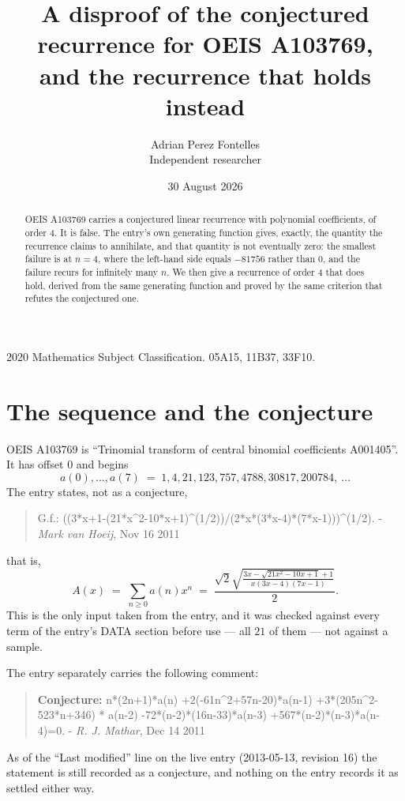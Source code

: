 \documentclass[11pt,a4paper]{article}
\title{A disproof of the conjectured recurrence for OEIS A103769,\\ and the recurrence
that holds instead}
\author{Adrian Perez Fontelles\\ \small Independent researcher}
\date{30 August 2026}
\theoremstyle{plain}
\theoremstyle{definition}
\begin{document}
\maketitle

\begin{abstract}
OEIS A103769 carries a conjectured linear recurrence with polynomial coefficients, of
order 4. It is false. The entry's own generating function gives, exactly, the
quantity the recurrence claims to annihilate, and that quantity is not eventually zero:
the smallest failure is at $n=4$, where the left-hand side equals $-81756$
rather than $0$, and the failure recurs for infinitely many $n$. We then give a recurrence
of order 4 that does hold, derived from the same generating function and proved by
the same criterion that refutes the conjectured one.
\end{abstract}

\noindent\small 2020 Mathematics Subject Classification. 05A15, 11B37, 33F10.\normalsize

\section{The sequence and the conjecture}

OEIS A103769 is ``Trinomial transform of central binomial coefficients A001405''. It has offset $0$ and begins
\[
a(0),\dots,a(7)\;=\;1, 4, 21, 123, 757, 4788, 30817, 200784,\ \dots
\]
The entry states, not as a conjecture,
\begin{quote}\small
G.f.: ((3*x+1-(21*x\^{}2-10*x+1)\^{}(1/2))/(2*x*(3*x-4)*(7*x-1)))\^{}(1/2). - \emph{Mark van Hoeij}, Nov 16 2011
\end{quote}
that is,
\begin{equation}\label{eq:gf}
A(x)\;=\;\sum_{n\ge 0}a(n)x^{n}\;=\;\frac{\sqrt{2} \sqrt{\frac{3 x - \sqrt{21 x^{2} - 10 x + 1} + 1}{x \left(3 x - 4\right) \left(7 x - 1\right)}}}{2} .
\end{equation}
This is the only input taken from the entry, and it was checked against every term of the
entry's DATA section before use --- all $21$ of them --- not against a sample.

The entry separately carries the following comment:
\begin{quote}\small
\textbf{Conjecture:} n*(2n+1)*a(n) +2(-61n\^{}2+57n-20)*a(n-1) +3*(205n\^{}2-523*n+346) * a(n-2) -72*(n-2)*(16n-33)*a(n-3) +567*(n-2)*(n-3)*a(n-4)=0. - \emph{R. J. Mathar}, Dec 14 2011
\end{quote}
As of the ``Last modified'' line on the live entry (2013-05-13, revision 16) the
statement is still recorded as a conjecture, and nothing on the entry records it as
settled either way.
\end{document}
